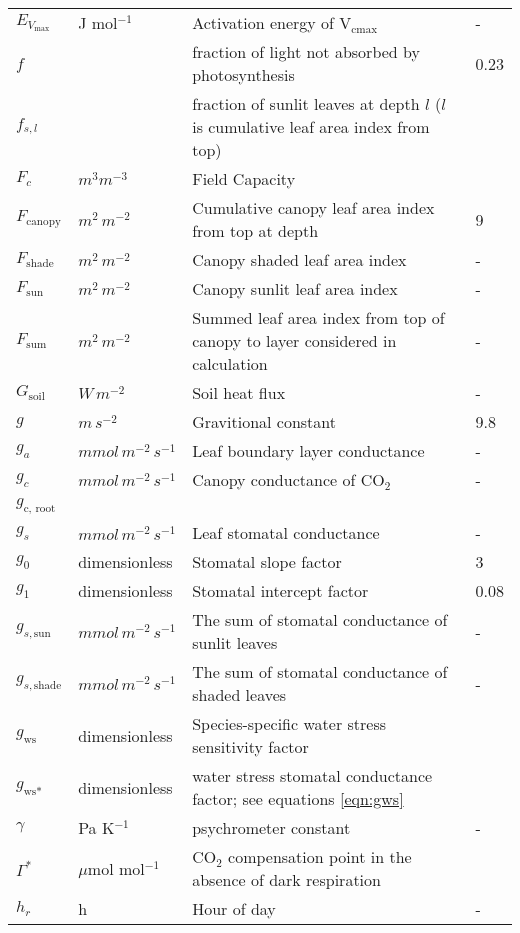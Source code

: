\documentclass[10pt]{article}
\begin{document}
\begin{center}
\begin{longtable}{l l p{3in} p{0.5in}}
$E_{V_\text{max}}$ & J mol$^{-1}$ & Activation energy of V$_\text{cmax}$& - \\
$f$ & & fraction of light not absorbed by photosynthesis & 0.23 \\
$f_{s,l}$ & & fraction of sunlit leaves at depth $l$ ($l$ is cumulative leaf area index from top) & \\
$F_c$ & $m^3m^{-3}$ & Field Capacity & \\
$F_{\text{canopy}}$	&	$m^2\, m^{-2}$	&Cumulative canopy leaf area index from top at depth	&	9	\\
$F_{\text{shade}}$	&	$m^2\, m^{-2}$	&	Canopy shaded leaf area index	&	-	\\
$F_{\text{sun}}$	&	$m^2\,m^{-2}$	&	Canopy sunlit leaf area index	&	-	\\
$F_{\text{sum}}$	&	$m^2\, m^{-2}$	&	Summed leaf area index from top of canopy to layer considered in calculation	&	-	\\
$G_{\text{soil}}$	&	$W\,m^{-2}$	&	Soil heat flux	&	-	\\
$g$	&	$m\, s^{-2}$	&	Gravitional constant	&	9.8	\\
$g_a$	&	$mmol\,m^{-2}\, s^{-1}$	&	Leaf boundary layer conductance	&	-	\\
$g_c$	&	$mmol\,m^{-2}\, s^{-1}$	&	Canopy conductance of CO$_2$ 	&	-	\\
$g_\text{c, root}$	&	& & \marginnote{undefined}\\
$g_s$	&	$mmol\,m^{-2}\, s^{-1}$	&	Leaf stomatal conductance	&	-	\\
$g_0$	&	dimensionless	&	Stomatal slope factor	&	3	\\
$g_1$	&	dimensionless	&	Stomatal intercept factor	&	0.08	\\
$g_{s,\text{sun}}$	&	$mmol\, m^{-2}\, s^{-1}$	&	The sum of stomatal conductance of sunlit leaves	&	-	\\
$g_{s,\text{shade}}$	&	$mmol\, m^{-2}\, s^{-1}$	&	The sum of stomatal conductance of shaded leaves	&	-	\\
$g_\text{ws}$ & dimensionless & Species-specific water stress sensitivity factor & \\
$g_\text{ws*}$ & dimensionless & water stress stomatal conductance factor; see equations \ref{eqn:gws} &\\
$\gamma$	&	Pa K$^{-1}$	&	psychrometer constant 	&	-	\\
$\Gamma^\ast$ & $\mu$mol mol$^{-1}$ & CO$_2$ compensation point in the absence of dark respiration & \\
$h_r$	&	h	&	Hour of day	&	-	\\

\end{longtable}
\end{center}
\end{document}
